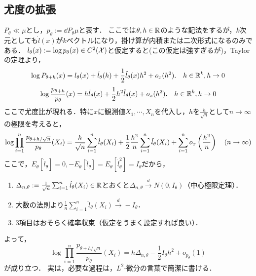 \documentclass[uplatex,dvipdfmx]{jsreport}
\begin{document}
\subsection{尤度の拡張}

\begin{discussion}
    $P_\theta\ll\mu$とし，$p_\theta:=\dd{P_\theta}{\mu}$と表す．
    ここでは$\theta,h\in\mathbb{R}$のような記法をするが，$k$次元としても$\dot{l}(x)$が$k$ベクトルになり，掛け算が内積または二次形式になるのみである．
    $l_\theta(x):=\log p_\theta(x)\in C^2(\mathcal{X})$と仮定すると(この仮定は強すぎるが)，Taylorの定理より，
    \[\log P_{\theta+h}(x)=l_\theta(x)+\dot{l}_\theta(h)+\frac{1}{2}\ddot{l}_\theta(x)h^2+o_x(h^2).\quad h\in\mathbb{R}^k,h\to0\]
    \[\log\frac{p_{\theta+h}}{p_\theta}(x)=h\dot{l}_\theta(x)+\frac{1}{2}h^2\ddot{l}_\theta(x)+o_x(h^2).\quad h\in\mathbb{R}^k,h\to0\]
    ここで尤度比が現れる．特に$x$に観測値$X_1,\cdots,X_n$を代入し，$h$を$\frac{h}{\sqrt{n}}$として$n\to\infty$の極限を考えると，
    \[\log\prod_{i=1}^n\frac{p_{\theta+h/\sqrt{n}}}{p_\theta}(X_i)=\frac{h}{\sqrt{n}}\sum^n_{i=1}\dot{l}_\theta(X_i)+\frac{1}{2}\frac{h^2}{n}\sum^n_{i=1}\ddot{l}_\theta(X_i)+\sum_{i=1}^no_x\left(\frac{h^2}{n}\right)\quad(n\to\infty)\]
    ここで，$E_\theta[\dot{l}_\theta]=0,-E_\theta[\ddot{l}_\theta]=E_\theta[\dot{l}^2_\theta]=I_\theta$だから，
    \begin{enumerate}
        \item $\Delta_{n,\theta}:=\frac{1}{\sqrt{n}}\sum^n_{i=1}\dot{l}_\theta(X_i)\in\mathbb{R}$とおくと$\Delta_{n,\theta}\xrightarrow{d}N(0,I_\theta)$（中心極限定理）．
        \item 大数の法則より$\frac{1}{n}\sum^n_{i=1}\ddot{l}_\theta(X_i)\xrightarrow{d}-I_\theta$．
        \item 3項目はおそらく確率収束（仮定をうまく設定すれば良い）．
    \end{enumerate}
    よって，
    \[\log\prod_{i=1}^n\frac{p_{\theta+h/\sqrt{n}}}{p_\theta}(X_i)=h\Delta_{n,\theta}-\frac{1}{2}I_\theta h^2+o_{p_\theta}(1)\]
    が成り立つ．
    実は，必要な過程は，$L^2$-微分の言葉で簡潔に書ける．
\end{discussion}
\end{document}
